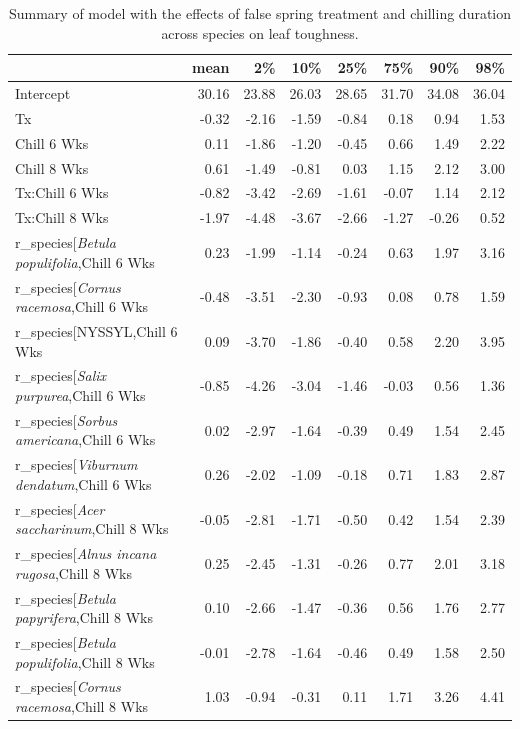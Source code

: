 \documentclass{article}\usepackage[]{graphicx}\usepackage[]{color}
\begin{document}
\begin{longtable}{lrrrrrrr}
\caption{Summary of model with the effects of false spring treatment and chilling duration across species on leaf toughness.} \\ 
  \hline
 & mean & 2\% & 10\% & 25\% & 75\% & 90\% & 98\% \\ 
  \hline \endhead  \hline
Intercept & 30.16 & 23.88 & 26.03 & 28.65 & 31.70 & 34.08 & 36.04 \\ 
  Tx & -0.32 & -2.16 & -1.59 & -0.84 & 0.18 & 0.94 & 1.53 \\ 
  Chill 6 Wks & 0.11 & -1.86 & -1.20 & -0.45 & 0.66 & 1.49 & 2.22 \\ 
  Chill 8 Wks & 0.61 & -1.49 & -0.81 & 0.03 & 1.15 & 2.12 & 3.00 \\ 
  Tx:Chill 6 Wks & -0.82 & -3.42 & -2.69 & -1.61 & -0.07 & 1.14 & 2.12 \\ 
  Tx:Chill 8 Wks & -1.97 & -4.48 & -3.67 & -2.66 & -1.27 & -0.26 & 0.52 \\ 
  r_species[\textit{Betula populifolia},Chill 6 Wks & 0.23 & -1.99 & -1.14 & -0.24 & 0.63 & 1.97 & 3.16 \\ 
  r_species[\textit{Cornus racemosa},Chill 6 Wks & -0.48 & -3.51 & -2.30 & -0.93 & 0.08 & 0.78 & 1.59 \\ 
  r_species[NYSSYL,Chill 6 Wks & 0.09 & -3.70 & -1.86 & -0.40 & 0.58 & 2.20 & 3.95 \\ 
  r_species[\textit{Salix purpurea},Chill 6 Wks & -0.85 & -4.26 & -3.04 & -1.46 & -0.03 & 0.56 & 1.36 \\ 
  r_species[\textit{Sorbus americana},Chill 6 Wks & 0.02 & -2.97 & -1.64 & -0.39 & 0.49 & 1.54 & 2.45 \\ 
  r_species[\textit{Viburnum dendatum},Chill 6 Wks & 0.26 & -2.02 & -1.09 & -0.18 & 0.71 & 1.83 & 2.87 \\ 
  r_species[\textit{Acer saccharinum},Chill 8 Wks & -0.05 & -2.81 & -1.71 & -0.50 & 0.42 & 1.54 & 2.39 \\ 
  r_species[\textit{Alnus incana rugosa},Chill 8 Wks & 0.25 & -2.45 & -1.31 & -0.26 & 0.77 & 2.01 & 3.18 \\ 
  r_species[\textit{Betula papyrifera},Chill 8 Wks & 0.10 & -2.66 & -1.47 & -0.36 & 0.56 & 1.76 & 2.77 \\ 
  r_species[\textit{Betula populifolia},Chill 8 Wks & -0.01 & -2.78 & -1.64 & -0.46 & 0.49 & 1.58 & 2.50 \\ 
  r_species[\textit{Cornus racemosa},Chill 8 Wks & 1.03 & -0.94 & -0.31 & 0.11 & 1.71 & 3.26 & 4.41 \\ 

\end{longtable}
\end{document}
